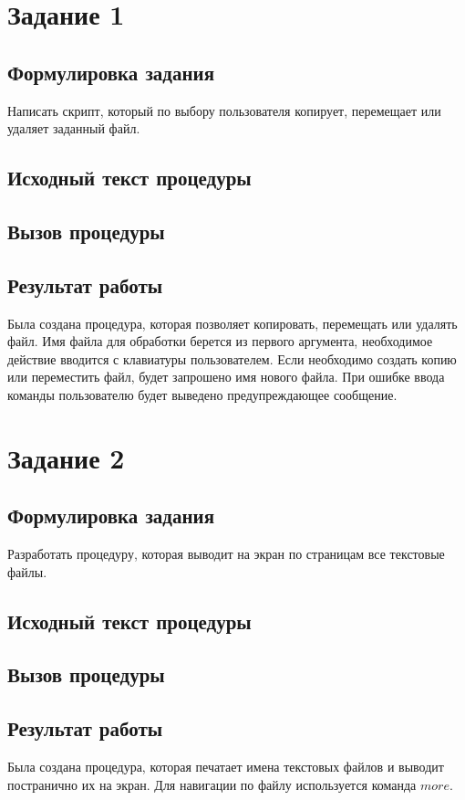 \documentclass[a4paper,14pt]{article}
\begin{document}


\tableofcontents
\pagebreak

\section{Задание 1}

\subsection{Формулировка задания}
Написать скрипт, который по выбору пользователя копирует, перемещает или удаляет заданный файл.

\subsection{Исходный текст процедуры}
{\small }
\subsection{Вызов процедуры}
{\small }
\subsection{Результат работы}
Была создана процедура, которая позволяет копировать, перемещать или удалять файл. 
Имя файла для обработки берется из первого аргумента, необходимое действие вводится с клавиатуры пользователем.
Если необходимо создать копию или переместить файл, будет запрошено имя нового файла.
При ошибке ввода команды пользователю будет выведено предупреждающее сообщение.

\pagebreak
\section{Задание 2}

\subsection{Формулировка задания}
Разработать процедуру, которая выводит на экран по страницам все текстовые файлы.

\subsection{Исходный текст процедуры}
{\small }
\subsection{Вызов процедуры}
{\small }
\subsection{Результат работы}
Была создана процедура, которая печатает имена текстовых файлов и выводит постранично их на экран.
Для навигации по файлу используется команда $more$.
\end{document}
